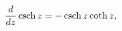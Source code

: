\[\frac{d}{dz}\mathop{\mathrm{csch}\/}\nolimits z=-\mathop{\mathrm{csch}\/}%
\nolimits z\mathop{\coth\/}\nolimits z,\]